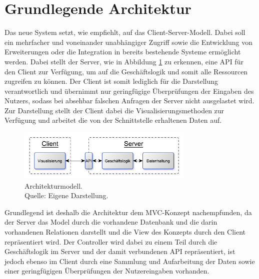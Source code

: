 \section{Grundlegende Architektur}
\label{sec:Architektur}

Das neue System setzt, wie \citeauthor{MS-Fielding.} empfiehlt, auf das Client-Server-Modell. Dabei soll ein mehrfacher und voneinander unabhängiger Zugriff sowie die Entwicklung von Erweiterungen oder die Integration in bereits bestehende Systeme ermöglicht werden.
Dabei stellt der Server, wie in Abbildung \ref{img:einkaufBPMN} zu erkennen, eine \ac{API} für den Client zur Verfügung, um auf die Geschäftslogik und somit alle Ressourcen zugreifen zu können.
Der Client ist somit lediglich für die Darstellung verantwortlich und übernimmt nur geringfügige Überprüfungen der Eingaben des Nutzers, sodass bei absehbar falschen Anfragen der Server nicht ausgelastet wird.
Zur Darstellung stellt der Client dabei die Visualisierungsmethoden zur Verfügung und arbeitet die von der Schnittstelle erhaltenen Daten auf.

\begin{figure}[h]
  \centering
  \includegraphics[width=0.75\textwidth]{img/konzeption/gesamtkonzept/Architektur.pdf}
  \captionsetup{format=hang,justification=raggedright,singlelinecheck=false}
  \caption[Architekturmodell]{Architekturmodell. \\Quelle: Eigene Darstellung.}
  \label{img:einkaufBPMN}
\end{figure}

Grundlegend ist deshalb die Architektur dem \ac{MVC}-Konzept nachempfunden, da der Server das Model durch die vorhandene Datenbank und die darin vorhandenen Relationen darstellt und die View des Konzepts durch den Client repräsentiert wird.
Der Controller wird dabei zu einem Teil durch die Geschäftslogik im Server und der damit verbundenen \ac{API} repräsentiert, ist jedoch ebenso im Client durch eine Sammlung und Aufarbeitung der Daten sowie einer geringfügigen Überprüfungen der Nutzereingaben vorhanden.\autocite{rf-leff2001web}
